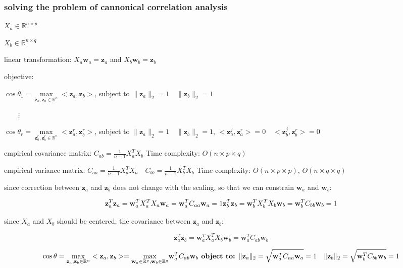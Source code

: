 \subsubsection{solving the problem of cannonical correlation analysis}

$X_a\in \mathbb{R}^{n\times p}$

$X_b\in \mathbb{R}^{n\times q}$

linear transformation: $X_a{\mathbf w}_a={\mathbf z}_a$ and $X_b{\mathbf w}_b={\mathbf z}_b$ 

objective:

$\cos \theta_1 = \underset{{\mathbf z}_a, {\mathbf z}_b \in\mathbb{R}^n}{\max}<{\mathbf z}_a, {\mathbf z}_b>$, subject to  $\|{\mathbf z}_a\|_2=1\quad \|{\mathbf z}_b\|_2=1$

$\qquad{\vdots}$

$\cos \theta_r = \underset{{\mathbf z}_a^r, {\mathbf z}_b^r \in\mathbb{R}^n}{\max}<{\mathbf z}_a^r, {\mathbf z}_b^r>$, subject to  $\|{\mathbf z}_a\|_2=1\quad \|{\mathbf z}_b\|_2=1$, $<{\mathbf z}_a^j, {\mathbf z}_a^r>=0\quad<{\mathbf z}_b^j, {\mathbf z}_b^r>=0$



empirical covariance matrix:  $C_{ab}=\frac{1}{n-1}X_a^TX_b$    Time complexity: $O(n\times p \times q)$

empirical variance matrix: $C_{aa}=\frac{1}{n-1}X_a^TX_a\quad C_{bb}=\frac{1}{n-1}X_b^TX_b$       Time complexity: $O(n\times p \times p)$,  $O(n\times q \times q)$

since correction between ${\mathbf z}_a$ and ${\mathbf z}_b$ does not change with the scaling, so that we can constrain ${\mathbf w}_a$ and ${\mathbf w}_b$:

$$
{\mathbf z}_a^T{\mathbf z}_a={\mathbf w}_a^TX_a^TX_a{\mathbf w}_a={\mathbf w}_a^T C_{aa}{\mathbf w}_a=1\\
{\mathbf z}_b^T{\mathbf z}_b={\mathbf w}_b^TX_b^TX_b{\mathbf w}_b={\mathbf w}_b^T C_{bb}{\mathbf w}_b=1
$$




since $X_a$ and $X_b$ should be centered, the covariance between  ${\mathbf z}_a$ and ${\mathbf z}_b$:

$$
{\mathbf z}_a^T{\mathbf z}_b={\mathbf w}_a^TX_a^TX_b{\mathbf w}_b={\mathbf w}_a^T C_{ab}{\mathbf w}_b
$$

$$
\cos \theta=\underset{{\mathbf z}_a, {\mathbf z}_b \in\mathbb{R}^n}{\max}<{\mathbf z}_a, {\mathbf z}_b>=\underset{{\mathbf w}_a\in \mathbb{R}^p, {\mathbf w}_b \in\mathbb{R}^q}{\max} {\mathbf w}_a^T C_{ab}{\mathbf w}_b\\
\textbf{ object to:  }  \|{\mathbf z}_a\|_2=\sqrt{{\mathbf w}_a^T C_{aa}{\mathbf w}_a}=1\quad \|{\mathbf z}_b\|_2=\sqrt{{\mathbf w}_b^T C_{bb}{\mathbf w}_b}=1
$$



